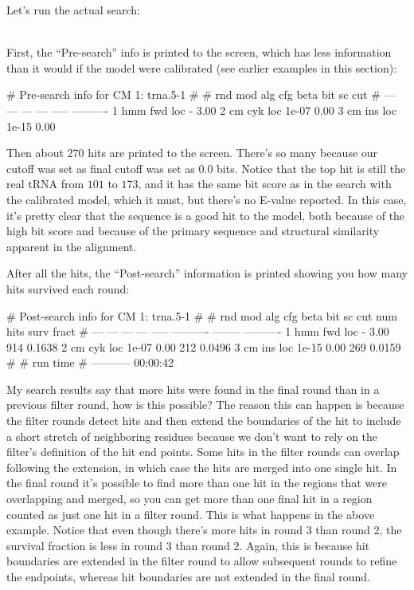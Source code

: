 Let's run the actual search:

\\

First, the ``Pre-search'' info is printed to the screen, which has
less information than it would if the model were calibrated (see
earlier examples in this section): 

\begin{sreoutput}
# Pre-search info for CM 1: trna.5-1
#
# rnd  mod  alg  cfg   beta  bit sc cut
# ---  ---  ---  ---  -----  ----------
    1  hmm  fwd  loc      -        3.00
    2   cm  cyk  loc  1e-07        0.00
    3   cm  ins  loc  1e-15        0.00
\end{sreoutput}

Then about 270 hits are printed to the screen. There's so many because
our cutoff was set as final cutoff was set as $0.0$ bits. Notice that 
the top hit is still the real tRNA from $101$ to $173$, and it 
has the same bit score as in the search with the calibrated model,
which it must, but there's no E-value reported. In this case, it's
pretty clear that the sequence is a good hit to the model, both
because of the high bit score and because of the primary sequence and
structural similarity apparent in the  alignment. 

After all the hits, the ``Post-search'' information is printed showing
you how many hits survived each round:

\begin{sreoutput}
# Post-search info for CM 1: trna.5-1
#
# rnd  mod  alg  cfg   beta  bit sc cut  num hits  surv fract
# ---  ---  ---  ---  -----  ----------  --------  ----------
    1  hmm  fwd  loc      -        3.00       914      0.1638
    2   cm  cyk  loc  1e-07        0.00       212      0.0496
    3   cm  ins  loc  1e-15        0.00       269      0.0159
#
#    run time
# -----------
     00:00:42
\end{sreoutput}

\begin{srefaq}{My search results say that more hits were found in the
final round than in a previous filter round, how is this possible?}
The reason this can happen is because the filter
rounds detect hits and then extend the boundaries of the hit to
include a short stretch of neighboring residues because
we don't want to rely on the filter's definition of the hit end
points. Some hits in the filter rounds can overlap following the
extension, in which case the hits are merged into one single hit. In the
final round it's possible to find more than one hit in the regions that
were overlapping and merged, so you can get more than one final hit in a
region counted as just one hit in a filter round. This is what happens
in the above example. Notice that even though there's more hits in
round 3 than round 2, the survival fraction is less in round 3 than
round 2. Again, this is because hit boundaries are extended in the
filter round to allow subsequent rounds to refine the endpoints,
whereas hit boundaries are not extended in the final round.
\end{srefaq}

